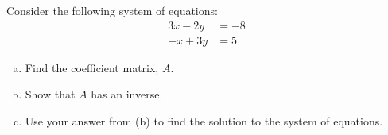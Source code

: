 \documentclass[11pt,letterpaper]{article}
\begin{document}

 Consider the following system of equations:
	\[
	\begin{aligned}
	3x - 2y&= -8 \\
	-x + 3y&= 5
	\end{aligned}
	\]

\begin{enumerate}[(a)]
\item Find the coefficient matrix, $A$. 
\item Show that $A$ has an inverse. 
\item Use your answer from (b) to find the solution to the system of equations. 
\end{enumerate} \pspace
\end{document}

